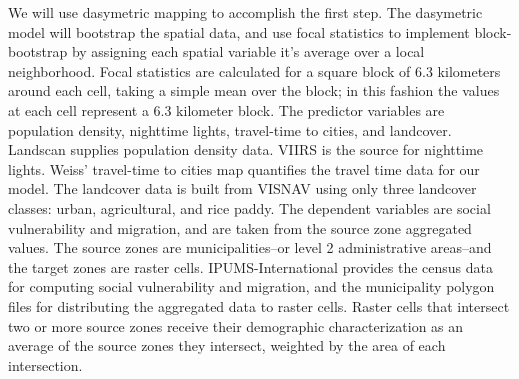 \documentclass[draft]{article}
\begin{document}
We will use dasymetric mapping to accomplish the first step.  The dasymetric model will bootstrap the spatial data, and use focal statistics to implement block-bootstrap by assigning each spatial variable it's average over a local neighborhood.
Focal statistics are calculated for a square block of 6.3 kilometers around each cell, taking a simple mean over the block; in this fashion the values at each cell represent a 6.3 kilometer block.  The predictor variables are population density, nighttime lights, travel-time to cities, and landcover.  %
Landscan \cite{landscan} supplies population density data.  VIIRS \cite{viirs} is the source for nighttime lights.  Weiss' travel-time to cities map quantifies the travel time data for our model.  The landcover data is built from VISNAV \cite{visnav} using only three landcover classes: urban, agricultural, and rice paddy.  The dependent variables are social vulnerability and migration, and are taken from the source zone aggregated values.  The source zones are municipalities--or level 2 administrative areas--and the target zones are raster cells.  IPUMS-International provides the census data for computing social vulnerability and migration, and the municipality polygon files for distributing the aggregated data to raster cells.  Raster cells that intersect two or more source zones receive their demographic characterization as an average of the source zones they intersect, weighted by the area of each intersection.

\end{document}
